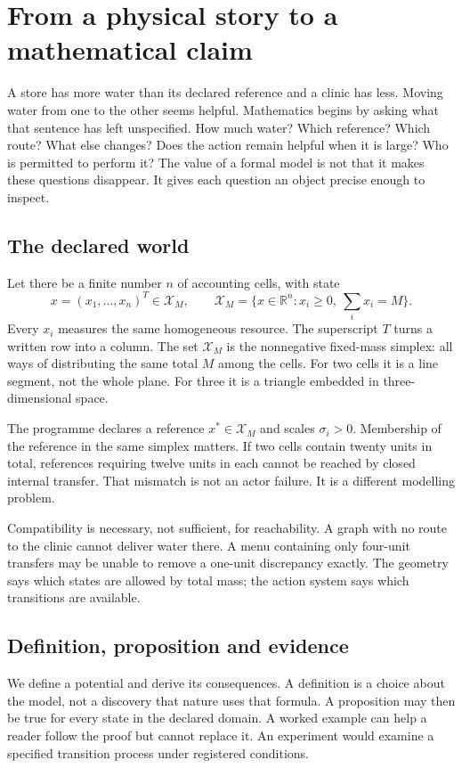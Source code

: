\chapter{From a physical story to a mathematical claim}\label{ch:contract}
A store has more water than its declared reference and a clinic has less.
Moving water from one to the other seems helpful. Mathematics begins by
asking what that sentence has left unspecified. How much water? Which
reference? Which route? What else changes? Does the action remain helpful
when it is large? Who is permitted to perform it? The value of a formal
model is not that it makes these questions disappear. It gives each question
an object precise enough to inspect.

\section{The declared world}
Let there be a finite number $n$ of accounting cells, with state
\begin{equation}
 x=(x_1,\ldots,x_n)^T\in\mathcal X_M,
 \qquad \mathcal X_M=\{x\in\mathbb R^n:x_i\geq0,\ \sum_i x_i=M\}.
\end{equation}
Every $x_i$ measures the same homogeneous resource. The superscript $T$
turns a written row into a column. The set $\mathcal X_M$ is the nonnegative
fixed-mass simplex: all ways of distributing the same total $M$ among the
cells. For two cells it is a line segment, not the whole plane. For three it
is a triangle embedded in three-dimensional space.

The programme declares a reference $x^*\in\mathcal X_M$ and scales
$\sigma_i>0$. Membership of the reference in the same simplex matters.
If two cells contain twenty units in total, references requiring twelve
units in each cannot be reached by closed internal transfer. That mismatch
is not an actor failure. It is a different modelling problem.

Compatibility is necessary, not sufficient, for reachability. A graph with
no route to the clinic cannot deliver water there. A menu containing only
four-unit transfers may be unable to remove a one-unit discrepancy exactly.
The geometry says which states are allowed by total mass; the action system
says which transitions are available.

\section{Definition, proposition and evidence}
We define a potential and derive its consequences. A definition is a choice
about the model, not a discovery that nature uses that formula. A proposition
may then be true for every state in the declared domain. A worked example
can help a reader follow the proof but cannot replace it. An experiment
would examine a specified transition process under registered conditions.

